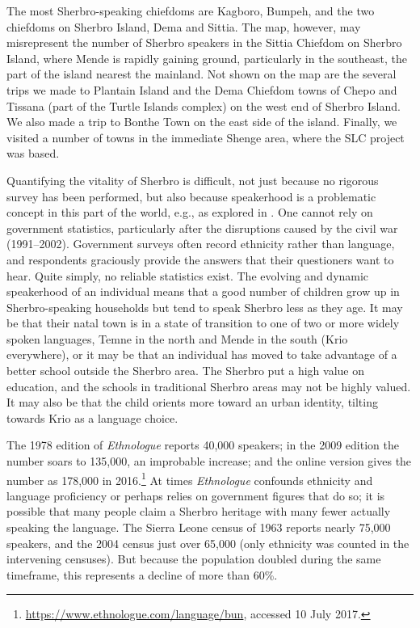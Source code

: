 The most Sherbro-speaking chiefdoms are Kagboro, Bumpeh, and the two chiefdoms on Sherbro Island, Dema and Sittia. The map, however, may misrepresent the number of Sherbro speakers in the Sittia Chiefdom on Sherbro Island, where Mende is rapidly gaining ground, particularly in the southeast, the part of the island nearest the mainland. Not shown on the map are the several trips we made to Plantain Island and the Dema Chiefdom towns of Chepo and Tissana (part of the Turtle Islands complex) on the west end of Sherbro Island. We also made a trip to Bonthe Town on the east side of the island. Finally, we visited a number of towns in the immediate Shenge area, where the SLC project was based.

Quantifying the vitality of Sherbro is difficult, not just because no rigorous survey has been performed, but also because speakerhood is a problematic concept in this part of the world, e.g., as explored in \citet{Lüpke2013}. One cannot rely on government statistics, particularly after the disruptions caused by the civil war (1991--2002). Government surveys often record ethnicity rather than language, and respondents graciously provide the answers that their questioners want to hear. Quite simply, no reliable statistics exist. The evolving and dynamic speakerhood of an individual means that a good number of children grow up in Sherbro-speaking households but tend to speak Sherbro less as they age. It may be that their natal town is in a state of transition to one of two or more widely spoken languages, Temne in the north and Mende in the south (Krio everywhere), or it may be that an individual has moved to take advantage of a better school outside the Sherbro area. The Sherbro put a high value on education, and the schools in traditional Sherbro areas may not be highly valued. It may also be that the child orients more toward an urban identity, tilting towards Krio as a language choice.

{The 1978} edition of \textit{Ethnologue} reports 40,000 speakers; in the 2009 edition the number soars to 135,000, an improbable increase; and the online version gives the number as 178,000 in 2016.\footnote{\url{https://www.ethnologue.com/language/bun}, accessed 10  {July 2017}.} At times \textit{Ethnologue} confounds ethnicity and language proficiency or perhaps relies on government figures that do so; it is possible that many people claim a Sherbro heritage with many fewer actually speaking the language. The Sierra Leone census of 1963 reports nearly 75,000 speakers, and the 2004 census just over 65,000 (only ethnicity was counted in the intervening censuses). But because the population doubled during the same timeframe, this represents a decline of more than 60\%.

